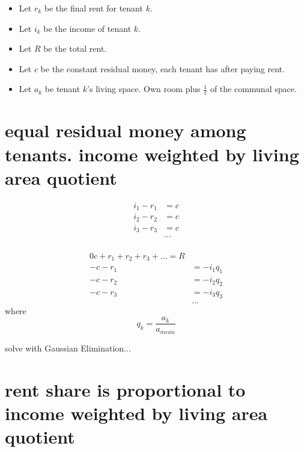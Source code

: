 \documentclass[11pt]{article}
\begin{document}
    \begin{itemize}
        \item
        Let $r_k$ be the final rent for tenant $k$.
        \item
        Let $i_k$ be the income of tenant $k$.
        \item
        Let $R$ be the total rent.
        \item
        Let $c$ be the constant residual money, each tenant has after paying rent.
        \item
        Let $a_k$ be tenant $k$'s living space. Own room plus $\frac{1}{t}$ of the communal space.
    \end{itemize}


    \section{equal residual money among tenants. income weighted by living area quotient}
    \begin{align}
        i_1 - r_1 &= c \\
        i_2 - r_2 &= c \\
        i_3 - r_3 &= c\\
        &\ldots
    \end{align}\\
    \newline
    \begin{align}
        0 c + r_1 + r_2 + r_3 + \ldots = R\\
        -c - r_1 &= -i_1 q_1 \\
        -c - r_2 &= -i_2 q_2 \\
        -c - r_3 &= -i_3 q_3 \\
        &\ldots
    \end{align}
    \newline
    where
    \begin{equation}
        q_k = \frac{a_k}{a_{mean}}
    \end{equation}
    \newline

    \newline \newline
    solve with Gaussian Elimination...


    \section{rent share is proportional to income weighted by living area quotient}
\end{document}
